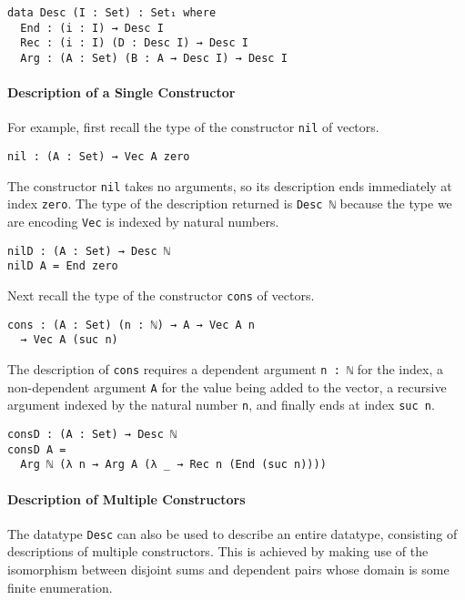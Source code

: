 \documentclass[preprint,nonatbib]{sigplanconf}
\begin{document}
\begin{verbatim}
data Desc (I : Set) : Set₁ where
  End : (i : I) → Desc I
  Rec : (i : I) (D : Desc I) → Desc I
  Arg : (A : Set) (B : A → Desc I) → Desc I
\end{verbatim}

\paragraph{Description of a Single Constructor}

For example, first recall the type of the
constructor {\tt nil} of vectors.

\begin{verbatim}
nil : (A : Set) → Vec A zero
\end{verbatim}

The constructor {\tt nil} takes no arguments, so its description
ends immediately at index {\tt zero}. The type of the description
returned is {\tt Desc ℕ} because the type we are encoding {\tt Vec}
is indexed by natural numbers.

\begin{verbatim}
nilD : (A : Set) → Desc ℕ
nilD A = End zero
\end{verbatim}

Next recall the type of the
constructor {\tt cons} of vectors.

\begin{verbatim}
cons : (A : Set) (n : ℕ) → A → Vec A n
  → Vec A (suc n)
\end{verbatim}

The description of {\tt cons} requires a dependent argument
{\tt n : ℕ} for the index, a non-dependent argument {\tt A} for the value
being added to the vector, a recursive argument indexed by the
natural number {\tt n}, and finally ends at index {\tt suc n}.

\begin{verbatim}
consD : (A : Set) → Desc ℕ
consD A =
  Arg ℕ (λ n → Arg A (λ _ → Rec n (End (suc n))))
\end{verbatim}

\paragraph{Description of Multiple Constructors}
\label{sec:background:multiple}

The datatype {\tt Desc} can also be used to describe an entire
datatype, consisting of descriptions of multiple constructors.
This is achieved by making use of the isomorphism between disjoint
sums and dependent pairs whose domain is some finite enumeration.
\end{document}

